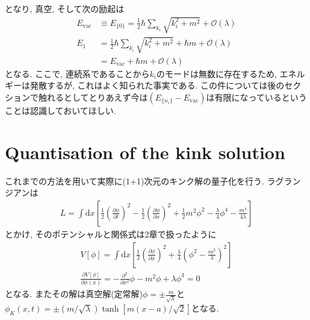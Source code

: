 \documentclass[dvipdfmx,11pt,a4paper,oneside,openany]{jsbook}
\begin{document}
となり, 真空, そして次の励起は
\begin{align}
    E_{\mathrm{vac}} & \equiv E_{\{0\}}=\frac{1}{2} \hbar \sum_{k_{i}} \sqrt{k_{i}^{2}+m^{2}}+\mathcal{O}(\lambda)  \\
    E_{1}            & =\frac{1}{2} \hbar \sum_{k_{i}} \sqrt{k_{i}^{2}+m^{2}}+\hbar m+\mathcal{O}(\lambda)\nonumber \\
                     & =E_\text{vac}+\hbar m+\mathcal{O}(\lambda)
\end{align}
となる. ここで, 連続系であることから$k_i$のモードは無数に存在するため, エネルギーは発散するが, これはよく知られた事実である. この件については後のセクションで触れるとしてとりあえず今は$(E_{\{n_i\}}-E_\text{vac})$は有限になっているということは認識しておいてほしい.

\section{Quantisation of the kink solution}
これまでの方法を用いて実際に(1+1)次元のキンク解の量子化を行う. ラグランジアンは
\begin{align}
    L=\int \mathrm{d} x\left[\frac{1}{2}\left(\frac{\partial \phi}{\partial t}\right)^{2}-\frac{1}{2}\left(\frac{\partial \phi}{\partial x}\right)^{2}+\frac{1}{2} m^{2} \phi^{2}-\frac{\lambda}{4} \phi^{4}-\frac{m^{4}}{4 \lambda}\right]
\end{align}
とかけ, そのポテンシャルと関係式は2章で扱ったように
\begin{align}
    V[\phi]=\int \mathrm{d}x\left[\frac{1}{2}\left(\frac{\partial \phi}{\partial x}\right)^{2}+\frac{\lambda}{4}\left(\phi^{2}-\frac{m^{2}}{\lambda}\right)^{2}\right] \\
    \frac{\partial V[\phi]}{\partial \phi(x)}=-\frac{\partial^{2}}{\partial x^{2}} \phi-m^{2} \phi+\lambda \phi^{3}=0\label{eq:5.38}
\end{align}
となる. またその解は真空解(定常解)$\phi=\pm\frac{m}{\sqrt{\lambda}}$と$\phi_{K}(x, t)=\pm(m / \sqrt{\lambda})\tanh[m(x-a)/\sqrt{2}]$となる.
\end{document}
